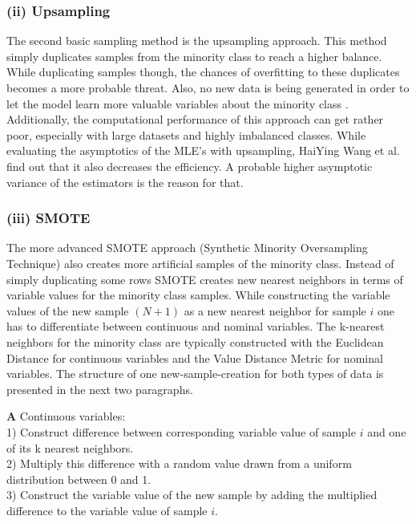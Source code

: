 \documentclass[12pt,titlepage]{article}
\begin{document}
\subsubsection*{(ii) Upsampling}

The second basic sampling method is the upsampling approach. This method simply duplicates samples from the minority class to reach a higher balance. While duplicating samples though, the chances of overfitting to these duplicates becomes a more probable threat. Also, no new data is being generated in order to let the model learn more valuable variables about the minority class \cite{mining_rarity}. Additionally, the computational performance of this approach can get rather poor, especially with large datasets and highly imbalanced classes. While evaluating the asymptotics of the MLE's with upsampling, HaiYing Wang et al. find out that it also decreases the efficiency. A probable higher asymptotic variance of the estimators is the reason for that. \\

\subsubsection*{(iii) SMOTE}

The more advanced SMOTE approach (Synthetic Minority Oversampling Technique) \cite{smote} also creates more artificial samples of the minority class. Instead of simply duplicating some rows SMOTE creates new nearest neighbors in terms of variable values for the minority class samples. While constructing the variable values of the new sample $(N + 1)$ as a new nearest neighbor for sample $i$ one has to differentiate between continuous and nominal variables. The k-nearest neighbors for the minority class are typically constructed with the Euclidean Distance for continuous variables and the Value Distance Metric for nominal variables. The structure of one new-sample-creation for both types of data is presented in the next two paragraphs.
\vspace{6mm}
\indent

\textbf{A} Continuous variables: \\
1) Construct difference between corresponding variable value of sample $i$ and one of its k nearest neighbors. \\
2) Multiply this difference with a random value drawn from a uniform distribution between 0 and 1. \\
3) Construct the variable value of the new sample by adding the multiplied difference to the variable value of sample $i$.
\vspace{6mm}
\indent
\end{document}
